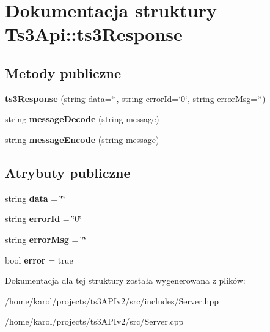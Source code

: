 \hypertarget{struct_ts3_api_1_1ts3_response}{}\section{Dokumentacja struktury Ts3\+Api\+:\+:ts3\+Response}
\label{struct_ts3_api_1_1ts3_response}
\subsection*{Metody publiczne}
\begin{DoxyCompactItemize}
\item 
{\bfseries ts3\+Response} (string data=\char`\"{}\char`\"{}, string error\+Id=\char`\"{}0\char`\"{}, string error\+Msg=\char`\"{}\char`\"{})\hypertarget{struct_ts3_api_1_1ts3_response_a042b64ba362ee4c20abeb5b1019a4f2e}{}\label{struct_ts3_api_1_1ts3_response_a042b64ba362ee4c20abeb5b1019a4f2e}

\item 
string {\bfseries message\+Decode} (string message)\hypertarget{struct_ts3_api_1_1ts3_response_ab86f3de75a74609f5d193593bc5dcd75}{}\label{struct_ts3_api_1_1ts3_response_ab86f3de75a74609f5d193593bc5dcd75}

\item 
string {\bfseries message\+Encode} (string message)\hypertarget{struct_ts3_api_1_1ts3_response_a389f5213e2e3c28e6dd23cd035b954ce}{}\label{struct_ts3_api_1_1ts3_response_a389f5213e2e3c28e6dd23cd035b954ce}

\end{DoxyCompactItemize}
\subsection*{Atrybuty publiczne}
\begin{DoxyCompactItemize}
\item 
string {\bfseries data} = \char`\"{}\char`\"{}\hypertarget{struct_ts3_api_1_1ts3_response_aa3ed5cc6cc00af0631109af4cc1537b9}{}\label{struct_ts3_api_1_1ts3_response_aa3ed5cc6cc00af0631109af4cc1537b9}

\item 
string {\bfseries error\+Id} = \char`\"{}0\char`\"{}\hypertarget{struct_ts3_api_1_1ts3_response_a5d1bfb46754667196c77d5b8cb0fc00f}{}\label{struct_ts3_api_1_1ts3_response_a5d1bfb46754667196c77d5b8cb0fc00f}

\item 
string {\bfseries error\+Msg} = \char`\"{}\char`\"{}\hypertarget{struct_ts3_api_1_1ts3_response_a49ce712e761bd347b69c2a3bdf827e57}{}\label{struct_ts3_api_1_1ts3_response_a49ce712e761bd347b69c2a3bdf827e57}

\item 
bool {\bfseries error} = true\hypertarget{struct_ts3_api_1_1ts3_response_a07b75d89c300e345763933e062c5777f}{}\label{struct_ts3_api_1_1ts3_response_a07b75d89c300e345763933e062c5777f}

\end{DoxyCompactItemize}


Dokumentacja dla tej struktury została wygenerowana z plików\+:\begin{DoxyCompactItemize}
\item 
/home/karol/projects/ts3\+A\+P\+Iv2/src/includes/Server.\+hpp\item 
/home/karol/projects/ts3\+A\+P\+Iv2/src/Server.\+cpp\end{DoxyCompactItemize}
